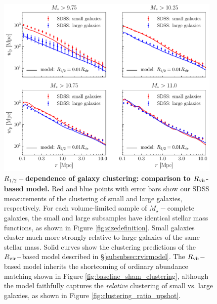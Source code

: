 \documentclass[usenatbib,usegraphicx,letterpaper]{mn2e}
\newcommand{\rhalf}{R_{1/2}}
\newcommand{\mstar}{M_{\star}}
\newcommand{\rvir}{R_{\rm vir}}
\begin{document}
\begin{figure}
\centering
\includegraphics[width=11cm]{FIGS/rvir_only_wp_large_small_absolute.pdf}
\caption{
{\bf $\rhalf-$dependence of galaxy clustering: comparison to $\rvir$-based model.}
Red and blue points with error bars show our SDSS measurements of the clustering of small and large galaxies, respectively. For each volume-limited sample of $\mstar-$complete galaxies, the small and large subsamples have identical stellar mass functions, as shown in Figure \ref{fig:sizedefinition}. Small galaxies cluster much more strongly relative to large galaxies of the same stellar mass. Solid curves show the clustering predictions of the $\rvir-$based model described in \S\ref{subsubsec:rvirmodel}. The $\rvir-$based model inherits the shortcoming of ordinary abundance matching shown in Figure \ref{fig:baseline_sham_clustering}, although the model faithfully captures the {\em relative} clustering of small vs. large galaxies, as shown in Figure \ref{fig:clustering_ratio_upshot}.
}
\label{fig:rvir_only_clustering_absolute}
\end{figure}
\end{document}

